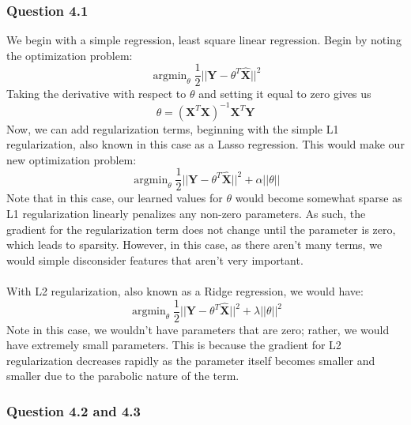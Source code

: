 \documentclass[11pt,letterpaper]{article}
\DeclareMathOperator*{\argmin}{argmin}
\begin{document}
\subsubsection*{Question 4.1}
We begin with a simple regression, least square linear regression. Begin by 
noting the optimization problem:
\begin{equation}
    \argmin_{\theta} \dfrac{1}{2}||\textbf{Y}-\theta^T\hat{\textbf{X}}||^2
\end{equation}
Taking the derivative with respect to $\theta$ and setting it equal to zero 
gives us 
\begin{equation}
\theta = \left(\textbf{X}^T\textbf{X}\right)^{-1}\textbf{X}^T\textbf{Y}
\end{equation}
Now, we can add regularization terms, beginning with the simple L1 
regularization, also known in this case as a Lasso regression. This would make 
our new optimization problem:
\begin{equation}
    \argmin_{\theta} \dfrac{1}{2}||\textbf{Y}-\theta^T\hat{\textbf{X}}||^2 + 
    \alpha ||\theta||
\end{equation}
Note that in this case, our learned values for $\theta$ would become somewhat 
sparse as L1 regularization linearly penalizes any non-zero parameters.
As such, the gradient for the regularization term does not change until the 
parameter is zero, which leads to sparsity. However, in this case, as there 
aren't many terms, we would simple disconsider features that aren't very 
important. \\ \\
With L2 regularization, also known as a Ridge regression, we would have:
\begin{equation}
    \argmin_{\theta} \dfrac{1}{2}||\textbf{Y}-\theta^T\hat{\textbf{X}}||^2 + 
    \lambda ||\theta||^2
\end{equation}
Note in this case, we wouldn't have parameters that are zero; rather, we would 
have extremely small parameters. This is because the gradient for L2 
regularization decreases rapidly as the parameter itself becomes smaller and 
smaller due to the parabolic nature of the term. 

\subsubsection*{Question 4.2 and 4.3}
\end{document}
